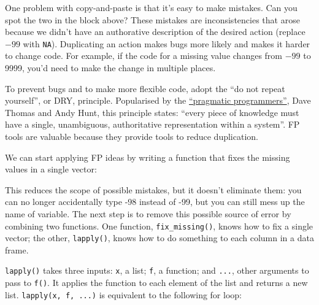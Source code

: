 One problem with copy-and-paste is that it's easy to make mistakes. Can
you spot the two in the block above? These mistakes are inconsistencies
that arose because we didn't have an authorative description of the
desired action (replace \(-99\) with \texttt{NA}). Duplicating an action
makes bugs more likely and makes it harder to change code. For example,
if the code for a missing value changes from \(-99\) to 9999, you'd need
to make the change in multiple places.

To prevent bugs and to make more flexible code, adopt the ``do not
repeat yourself'', or DRY, principle. Popularised by the
\href{http://pragprog.com/about}{``pragmatic programmers''}, Dave Thomas
and Andy Hunt, this principle states: ``every piece of knowledge must
have a single, unambiguous, authoritative representation within a
system''. FP tools are valuable because they provide tools to reduce
duplication.

We can start applying FP ideas by writing a function that fixes the
missing values in a single vector:

\begin{Shaded}
\begin{Highlighting}[]
\StringTok{ }
  \NormalTok{x[x ==}\StringTok{ }\NormalTok{-}\NormalTok{] <-}\StringTok{ }
\NormalTok{\}}
\StringTok{ }
\StringTok{ }
\StringTok{ }
\StringTok{ }
\StringTok{ }
\StringTok{ }
\end{Highlighting}
\end{Shaded}

This reduces the scope of possible mistakes, but it doesn't eliminate
them: you can no longer accidentally type -98 instead of -99, but you
can still mess up the name of variable. The next step is to remove this
possible source of error by combining two functions. One function,
\texttt{fix\_missing()}, knows how to fix a single vector; the other,
\texttt{lapply()}, knows how to do something to each column in a data
frame.

\texttt{lapply()} takes three inputs: \texttt{x}, a list; \texttt{f}, a
function; and \texttt{...}, other arguments to pass to \texttt{f()}. It
applies the function to each element of the list and returns a new list.
\texttt{lapply(x, f, ...)} is equivalent to the following for loop:

